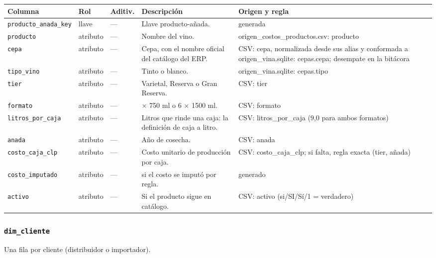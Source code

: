 {\footnotesize
\begin{longtable}{@{}>{\raggedright\arraybackslash}p{}>{\raggedright\arraybackslash}p{}>{\raggedright\arraybackslash}p{}>{\raggedright\arraybackslash}p{}>{\raggedright\arraybackslash}p{}@{}}
\toprule
Columna & Rol & Aditiv. & Descripción & Origen y regla \\
\midrule
\endhead
\texttt{producto\_anada\_key} & llave & — & Llave producto-añada. & generada \\
\texttt{producto} & atributo & — & Nombre del vino. & origen\_costos\_productos.\allowbreak{}csv: producto \\
\texttt{cepa} & atributo & — & Cepa, con el nombre oficial del catálogo del ERP. & CSV: cepa, normalizada desde sus alias y conformada a origen\_vina.\allowbreak{}sqlite: cepas.\allowbreak{}cepa; desempate en la bitácora \\
\texttt{tipo\_vino} & atributo & — & Tinto o blanco. & origen\_vina.\allowbreak{}sqlite: cepas.\allowbreak{}tipo \\
\texttt{tier} & atributo & — & Varietal, Reserva o Gran Reserva. & CSV: tier \\
\texttt{formato} & atributo & — & 12 $\times$ 750 ml o 6 $\times$ 1500 ml. & CSV: formato \\
\texttt{litros\_por\_caja} & atributo & — & Litros que rinde una caja: la definición de caja a litro. & CSV: litros\_por\_caja (9,0 para ambos formatos) \\
\texttt{anada} & atributo & — & Año de cosecha. & CSV: anada \\
\texttt{costo\_caja\_clp} & atributo & — & Costo unitario de producción por caja. & CSV: costo\_caja\_clp; si falta, regla exacta (tier, añada) \\
\texttt{costo\_imputado} & atributo & — & 1 si el costo se imputó por regla. & generado \\
\texttt{activo} & atributo & — & Si el producto sigue en catálogo. & CSV: activo (si/SI/Sí/1 = verdadero) \\
\bottomrule
\end{longtable}
}

\subsubsection*{\texttt{dim\_cliente}}
Una fila por cliente (distribuidor o importador).

